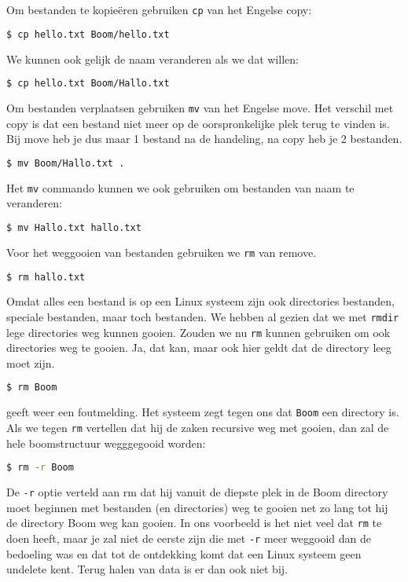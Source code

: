 Om bestanden te kopie\"eren gebruiken \texttt{cp} van het Engelse copy:
\begin{lstlisting}[language=bash]
$ cp hello.txt Boom/hello.txt
\end{lstlisting}
We kunnen ook gelijk de naam veranderen als we dat willen:
\begin{lstlisting}[language=bash]
$ cp hello.txt Boom/Hallo.txt
\end{lstlisting}

Om bestanden verplaatsen gebruiken \texttt{mv} van het Engelse move. Het verschil met copy is dat een bestand niet meer op de oorspronkelijke plek terug te vinden is. Bij move heb je dus maar 1 bestand na de handeling, na copy heb je 2 bestanden.
\begin{lstlisting}[language=bash]
$ mv Boom/Hallo.txt .
\end{lstlisting}
Het \texttt{mv} commando kunnen we ook gebruiken om bestanden van naam te veranderen:
\begin{lstlisting}[language=bash]
$ mv Hallo.txt hallo.txt
\end{lstlisting}

Voor het weggooien van bestanden gebruiken we \texttt{rm} van remove.
\begin{lstlisting}[language=bash]
$ rm hallo.txt
\end{lstlisting}

Omdat alles een bestand is op een Linux systeem zijn ook directories bestanden, speciale bestanden, maar toch bestanden. We hebben al gezien dat we met \texttt{rmdir} lege directories weg kunnen gooien. Zouden we nu \texttt{rm} kunnen gebruiken om ook directories weg te gooien. Ja, dat kan, maar ook hier geldt dat de directory leeg moet zijn.
\begin{lstlisting}[language=bash]
$ rm Boom
\end{lstlisting}
geeft weer een foutmelding. Het systeem zegt tegen ons dat \texttt{Boom} een directory is. Als we tegen \texttt{rm} vertellen dat hij de zaken recursive weg met gooien, dan zal de hele boomstructuur wegggegooid worden:
\begin{lstlisting}[language=bash]
$ rm -r Boom
\end{lstlisting}
De \texttt{-r} optie verteld aan rm dat hij vanuit de diepste plek in de Boom directory moet beginnen met bestanden (en directories) weg te gooien net zo lang tot hij de directory Boom weg kan gooien. In ons voorbeeld is het niet veel dat \texttt{rm} te doen heeft, maar je zal niet de eerste zijn die met \texttt{-r} meer weggooid dan de bedoeling was en dat tot de ontdekking komt dat een Linux systeem geen undelete kent. Terug halen van data is er dan ook niet bij.
